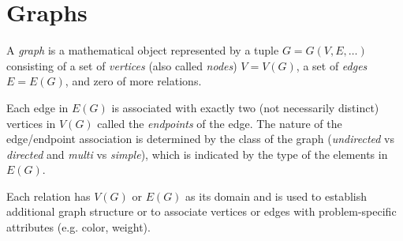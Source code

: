 \documentclass[letterpaper,12pt,fleqn]{article}
\begin{document}
\section*{Graphs}

\begin{definition}[Graph]
  A \emph{graph} is a mathematical object represented by a tuple \(G=G(V,E,\ldots)\) consisting of a set of
  \emph{vertices} (also called \emph{nodes}) \(V=V(G)\), a set of \emph{edges} \(E=E(G)\), and zero of more
  relations.

  Each edge in \(E(G)\) is associated with exactly two (not necessarily distinct) vertices in \(V(G)\) called the
  \emph{endpoints} of the edge.  The nature of the edge/endpoint association is determined by the class of the
  graph (\emph{undirected} vs \emph{directed} and \emph{multi} vs \emph{simple}), which is indicated by the type of
  the elements in \(E(G)\).

  Each relation has \(V(G)\) or \(E(G)\) as its domain and is used to establish additional graph structure or to
  associate vertices or edges with problem-specific attributes (e.g. color, weight).
\end{definition}
\end{document}
